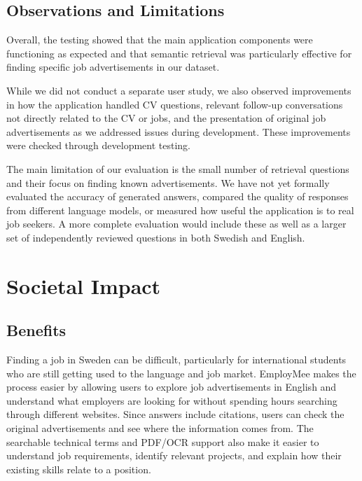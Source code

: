\documentclass[a4paper,10pt]{article}
\begin{document}
\subsection{Observations and Limitations}

Overall, the testing showed that the main application components were functioning as expected and that semantic retrieval was particularly effective for finding specific job advertisements in our dataset.

While we did not conduct a separate user study, we also observed improvements in how the application handled CV questions, relevant follow-up conversations not directly related to the CV or jobs, and the presentation of original job advertisements as we addressed issues during development. These improvements were checked through development testing.

The main limitation of our evaluation is the small number of retrieval questions and their focus on finding known advertisements. We have not yet formally evaluated the accuracy of generated answers, compared the quality of responses from different language models, or measured how useful the application is to real job seekers. A more complete evaluation would include these as well as a larger set of independently reviewed questions in both Swedish and English.


\section{Societal Impact}

\subsection{Benefits}
Finding a job in Sweden can be difficult, particularly for international students who are still getting used to the language and job market. EmployMee makes the process easier by allowing users to explore job advertisements in English and understand what employers are looking for without spending hours searching through different websites. Since answers include citations, users can check the original advertisements and see where the information comes from. The searchable technical terms and PDF/OCR support also make it easier to understand job requirements, identify relevant projects, and explain how their existing skills relate to a position.
\end{document}
